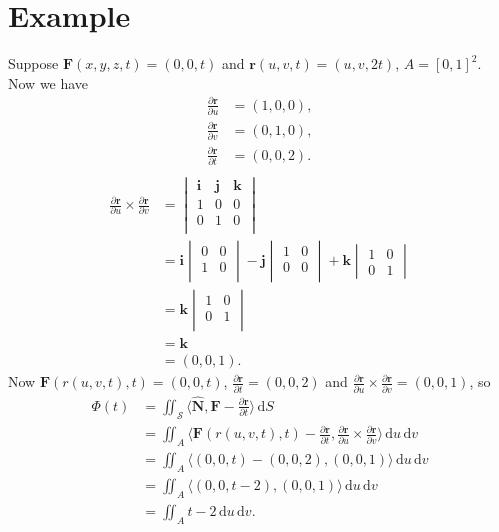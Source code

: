 \documentclass[12pt]{article}
\newcommand{\F}{\mathbf{F}}
\newcommand{\surf}{\mathbf{r}}
\newcommand{\N}{\hat{\mathbf{N}}}
\newcommand{\dr}{\partial \surf}
\newcommand{\du}{\partial u}
\newcommand{\dv}{\partial v}
\newcommand{\dt}{\partial t}
\newcommand{\dru}{\frac{\dr}{\du}}
\newcommand{\drv}{\frac{\dr}{\dv}}
\newcommand{\drt}{\frac{\dr}{\dt}}
\newcommand{\dS}{\,\mathrm{d}S}
\newcommand{\ii}{\mathbf{i}}
\newcommand{\jj}{\mathbf{j}}
\newcommand{\kk}{\mathbf{k}}
\newcommand{\ddu}{\, \mathrm{d}u}
\newcommand{\ddv}{\, \mathrm{d}v}
\begin{document}
\section*{Example}
Suppose $\F(x, y, z, t) = (0, 0, t)$ and $\surf(u, v, t) = (u, v, 2t)$, $A = \left[ 0, 1 \right]^2$. Now we have
\begin{align*}
\dru &= (1, 0, 0), \\
\drv &= (0, 1, 0), \\
\drt &= (0, 0, 2). \\
\end{align*}
\begin{align*}
\dru \times \drv &= 
\begin{vmatrix}
\ii & \jj & \kk \\
1  & 0   & 0  \\
0  & 1   & 0 \\
\end{vmatrix} \\
      &= \ii \begin{vmatrix}
      0 & 0 \\
      1 & 0 \\
      \end{vmatrix}
      - \jj \begin{vmatrix}
      1 & 0 \\
      0 & 0 \\
      \end{vmatrix}
      + \kk \begin{vmatrix}
      1 & 0 \\
      0 & 1
      \end{vmatrix} \\
      &= \kk \begin{vmatrix}
      1 & 0 \\
      0 & 1 \\
      \end{vmatrix} \\
      &= \kk \\
      &= (0, 0, 1).
\end{align*}
Now $\F(r(u, v, t), t) = (0, 0, t)$, $\drt = (0, 0, 2)$ and $\dru \times \drv = (0, 0, 1)$, so
\begin{align*}
\Phi(t) &= \iint_{\mathscr{S}} \langle \N, \F - \drt \rangle \dS \\
          &= \iint_A \langle \F(r(u,v,t), t) - \drt, \dru \times \drv \rangle \ddu \ddv \\
          &= \iint_A \langle (0, 0, t) - (0, 0, 2), (0, 0, 1) \rangle \ddu \ddv \\
          &= \iint_A \langle (0, 0, t  - 2), (0, 0, 1) \rangle \ddu \ddv \\
          &= \iint_A t - 2 \ddu \ddv.
\end{align*}
\end{document}

